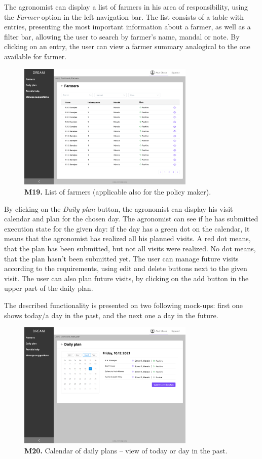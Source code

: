 The agronomist can display a list of farmers in his area of responsibility, using the \textit{Farmer} option in the left navigation bar. The list consists of a table with entries, presenting the most important information about a farmer, as well as a filter bar, allowing the user to search by farmer's name, mandal or note. By clicking on an entry, the user can view a farmer summary analogical to the one available for farmer.
\begin{figure}[H]
    \centering
    \includegraphics[width=0.75\textwidth]{mockups/Agronomist_Dashboard_Farmers.png}
    \caption{\textbf{M19.} List of farmers (applicable also for the policy maker).}
\end{figure}

By clicking on the \textit{Daily plan} button, the agronomist can display his visit calendar and plan for the chosen day. The agronomist can see if he has submitted execution state for the given day: if the day has a green dot on the calendar, it means that the agronomist has realized all his planned visits. A red dot means, that the plan has been submitted, but not all visits were realized. No dot means, that the plan hasn't been submitted yet. The user can manage future visits according to the requirements, using edit and delete buttons next to the given visit. The user can also plan future visits, by clicking on the add button in the upper part of the daily plan.

The described functionality is presented on two following mock-ups: first one shows today/a day in the past, and the next one a day in the future.
\begin{figure}[H]
    \centering
    \includegraphics[width=0.75\textwidth]{mockups/Agronomist_Dashboard_Visit plan.png}
    \caption{\textbf{M20.} Calendar of daily plans – view of today or day in the past.}
\end{figure}

